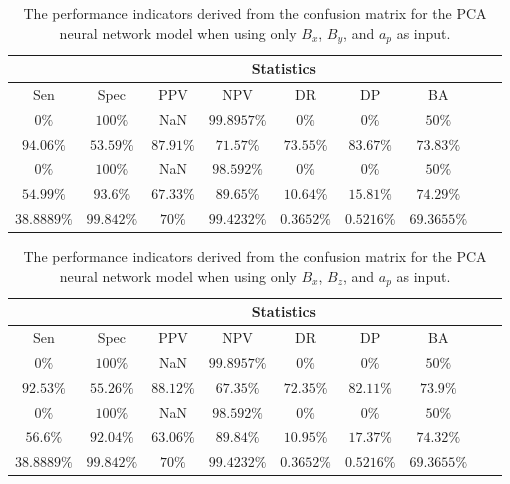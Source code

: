\begin{table}[!ht]
	\centering
	\begin{tabular}{|c|c|c|c|c|c|c|c|c|}
		\hline
		 & \multicolumn{7}{c|}{Statistics} \\ \hline
		Sen & Spec & PPV & NPV & DR & DP & BA \\ \hline
		$0\%$ & $100\%$ & NaN & $99.8957\%$ & $0\%$ & $0\%$ & $50\%$ \\ \hline
		$94.06\%$ & $53.59\%$ & $87.91\%$ & $71.57\%$ & $73.55\%$ & $83.67\%$ & $73.83\%$ \\ \hline
		$0\%$ & $100\%$ & NaN & $98.592\%$ & $0\%$ & $0\%$ & $50\%$ \\ \hline
		$54.99\%$ & $93.6\%$ & $67.33\%$ & $89.65\%$ & $10.64\%$ & $15.81\%$ & $74.29\%$ \\ \hline
		$38.8889\%$ & $99.842\%$ & $70\%$ & $99.4232\%$ & $0.3652\%$ & $0.5216\%$ & $69.3655\%$ \\ \hline
	\end{tabular}
	\caption{The performance indicators derived from the confusion matrix for the PCA neural network model when using only $B_{x}$, $B_{y}$, and $a_{p}$ as input.}
	\label{tab:cs:xyap:pcaNNet}
\end{table}

\begin{table}[!ht]
	\centering
	\begin{tabular}{|c|c|c|c|c|c|c|c|c|}
		\hline
		 & \multicolumn{7}{c|}{Statistics} \\ \hline
		Sen & Spec & PPV & NPV & DR & DP & BA \\ \hline
		$0\%$ & $100\%$ & NaN & $99.8957\%$ & $0\%$ & $0\%$ & $50\%$ \\ \hline
		$92.53\%$ & $55.26\%$ & $88.12\%$ & $67.35\%$ & $72.35\%$ & $82.11\%$ & $73.9\%$ \\ \hline
		$0\%$ & $100\%$ & NaN & $98.592\%$ & $0\%$ & $0\%$ & $50\%$ \\ \hline
		$56.6\%$ & $92.04\%$ & $63.06\%$ & $89.84\%$ & $10.95\%$ & $17.37\%$ & $74.32\%$ \\ \hline
		$38.8889\%$ & $99.842\%$ & $70\%$ & $99.4232\%$ & $0.3652\%$ & $0.5216\%$ & $69.3655\%$ \\ \hline
	\end{tabular}
	\caption{The performance indicators derived from the confusion matrix for the PCA neural network model when using only $B_{x}$, $B_{z}$, and $a_{p}$ as input.}
	\label{tab:cs:xzap:pcaNNet}
\end{table}

